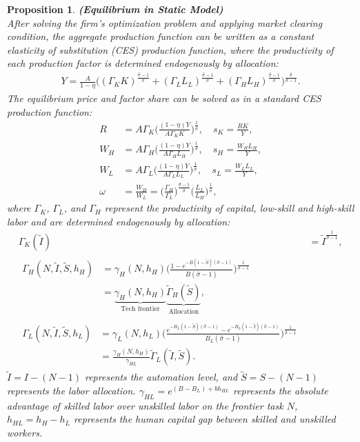 \documentclass[12pt]{article}
\newtheorem{proposition}{Proposition}
\begin{document}
\begin{proposition}{\bf (Equilibrium in Static Model)} \\

After solving the firm's optimization problem and applying market clearing condition, the aggregate production function can be written as a constant elasticity of substitution (CES) production function, where the productivity of each production factor is determined endogenously by allocation: 
\begin{align}
\label{output}
Y = \frac{A}{1-\eta}\Big((\Gamma_KK)^{\frac{\hat{\sigma}-1}{\hat{\sigma}}}+(\Gamma_LL_L)^{\frac{\hat{\sigma}-1}{\hat{\sigma}}}+(\Gamma_HL_H)^{\frac{\hat{\sigma}-1}{\hat{\sigma}}}\Big)^{\frac{\hat{\sigma}}{\hat{\sigma}-1}}.
\end{align}
The equilibrium price and factor share can be solved as in a standard CES production function: 
\begin{align*}
R &=A\Gamma_K\Big(\frac{(1-\eta)Y}{A\Gamma_KK}\Big)^{\frac{1}{\hat{\sigma}}},   \quad s_K= \frac{RK}{Y},  \\
W_H &=A\Gamma_H\Big(\frac{(1-\eta)Y}{A\Gamma_HL_H}\Big)^{\frac{1}{\hat{\sigma}}},  \quad s_H = \frac{W_HL_H}{Y},  \\
W_L &= A\Gamma_L\Big(\frac{(1-\eta)Y}{A\Gamma_LL_L}\Big)^{\frac{1}{\hat{\sigma}}},  \quad s_L = \frac{W_LL_L}{Y},   \\
\omega &= \frac{W_H}{W_L} = \Big(\frac{\Gamma_H}{\Gamma_L} \Big)^{\frac{\hat{\sigma}-1}{\hat{\sigma}}}\Big(\frac{L_L}{L_H} \Big)^{\frac{1}{\hat{\sigma}}}, 
\end{align*}
where $\Gamma_K$, $\Gamma_L$, and $\Gamma_H$ represent the productivity of capital, low-skill and high-skill labor and are determined endogenously by allocation: 
\begin{align}
\label{Gamma_K}
\Gamma_K(\tilde{I}) &= \tilde{I}^{\frac{1}{\hat{\sigma}-1}}, \\
\label{Gamma_H}
\begin{split}
\Gamma_H(N,\tilde{I},\tilde{S},h_H)  &= \gamma_H(N,h_H)\Big(\frac{1-e^{-B(1-\tilde{S})(\hat{\sigma}-1)}}{B(\hat{\sigma}-1)}\Big)^{\frac{1}{\hat{\sigma}-1}} \\
&= \underbrace{\gamma_H(N,h_H)}_{\text{Tech frontier}}\underbrace{\tilde{\Gamma}_H(\tilde{S})}_{\text{Allocation}},
\end{split}
\\
\label{Gamma_L}
\begin{split}
\Gamma_L(N,\tilde{I},\tilde{S},h_L)  &= \gamma_L(N,h_L)\Big(\frac{e^{-B_L(1-\tilde{S})(\hat{\sigma}-1)}-e^{-B_L(1-\tilde{I})(\hat{\sigma}-1)}}{B_L(\hat{\sigma}-1)}\Big)^{\frac{1}{\hat{\sigma}-1}}\\
 &=\frac{\gamma_H(N,h_H)}{\gamma_{HL}}\tilde{\Gamma}_L(\tilde{I},\tilde{S}).
 \end{split}
\end{align}
$\tilde{I} = I-(N-1)$ represents the automation level, and $\tilde{S} = S-(N-1)$ represents the labor allocation. $\gamma_{HL} = e^{(B-B_L)+bh_{HL}}$ represents the absolute advantage of skilled labor over unskilled labor on the frontier task $N$, $h_{HL} = h_H-h_L$ represents the human capital gap between skilled and unskilled workers.  
\end{proposition}
\end{document}
